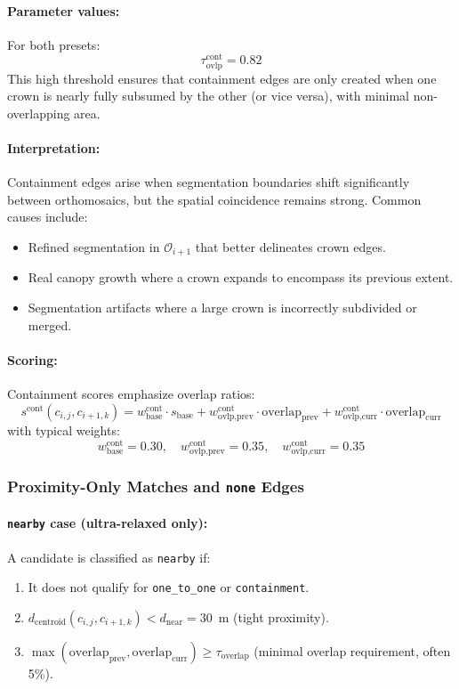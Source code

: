 \paragraph{Parameter values:} For both presets:
\[
\tau_{\text{ovlp}}^{\text{cont}} = 0.82
\]
This high threshold ensures that containment edges are only created when one crown is nearly fully subsumed by the other (or vice versa), with minimal non-overlapping area.

\paragraph{Interpretation:} Containment edges arise when segmentation boundaries shift significantly between orthomosaics, but the spatial coincidence remains strong. Common causes include:
\begin{itemize}
    \item Refined segmentation in $\mathcal{O}_{i+1}$ that better delineates crown edges.
    \item Real canopy growth where a crown expands to encompass its previous extent.
    \item Segmentation artifacts where a large crown is incorrectly subdivided or merged.
\end{itemize}

\paragraph{Scoring:} Containment scores emphasize overlap ratios:
\[
s^{\text{cont}}(c_{i,j}, c_{i+1,k}) = w_{\text{base}}^{\text{cont}} \cdot s_{\text{base}} + w_{\text{ovlp,prev}}^{\text{cont}} \cdot \text{overlap}_{\text{prev}} + w_{\text{ovlp,curr}}^{\text{cont}} \cdot \text{overlap}_{\text{curr}}
\]
with typical weights:
\[
w_{\text{base}}^{\text{cont}} = 0.30, \quad w_{\text{ovlp,prev}}^{\text{cont}} = 0.35, \quad w_{\text{ovlp,curr}}^{\text{cont}} = 0.35
\]

\subsubsection{Proximity-Only Matches and \texttt{none} Edges}

\paragraph{\texttt{nearby} case (ultra-relaxed only):} A candidate is classified as \texttt{nearby} if:
\begin{enumerate}
    \item It does not qualify for \texttt{one\_to\_one} or \texttt{containment}.
    \item $d_{\text{centroid}}(c_{i,j}, c_{i+1,k}) < d_{\text{near}} = 30$~m (tight proximity).
    \item $\max(\text{overlap}_{\text{prev}}, \text{overlap}_{\text{curr}}) \geq \tau_{\text{overlap}}$ (minimal overlap requirement, often 5\%).
\end{enumerate}

